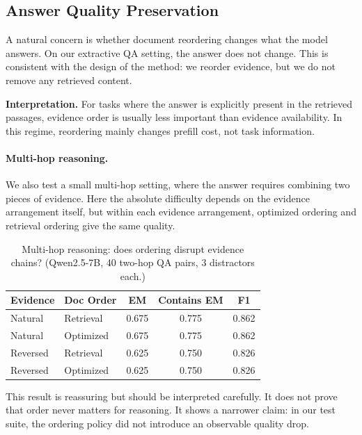 \documentclass{article}
\begin{document}
\subsection{Answer Quality Preservation}

A natural concern is whether document reordering changes what the model answers. On our extractive QA setting, the answer does not change. This is consistent with the design of the method: we reorder evidence, but we do not remove any retrieved content.

\textbf{Interpretation.} For tasks where the answer is explicitly present in the retrieved passages, evidence order is usually less important than evidence availability. In this regime, reordering mainly changes prefill cost, not task information.

\paragraph{Multi-hop reasoning.}
\label{sec:multihop}

We also test a small multi-hop setting, where the answer requires combining two pieces of evidence. Here the absolute difficulty depends on the evidence arrangement itself, but within each evidence arrangement, optimized ordering and retrieval ordering give the same quality.

\begin{table}[t]
\caption{Multi-hop reasoning: does ordering disrupt evidence chains? (Qwen2.5-7B, 40 two-hop QA pairs, 3 distractors each.)}
\label{tab:multihop}
\centering
\small
\begin{tabular}{@{}llccc@{}}
\toprule
\textbf{Evidence} & \textbf{Doc Order} & \textbf{EM} & \textbf{Contains EM} & \textbf{F1} \\
\midrule
Natural   & Retrieval  & 0.675 & 0.775 & 0.862 \\
Natural   & Optimized  & 0.675 & 0.775 & 0.862 \\
Reversed  & Retrieval  & 0.625 & 0.750 & 0.826 \\
Reversed  & Optimized  & 0.625 & 0.750 & 0.826 \\
\bottomrule
\end{tabular}
\vspace{-0.5em}
\end{table}

This result is reassuring but should be interpreted carefully. It does not prove that order never matters for reasoning. It shows a narrower claim: in our test suite, the ordering policy did not introduce an observable quality drop.
\end{document}
